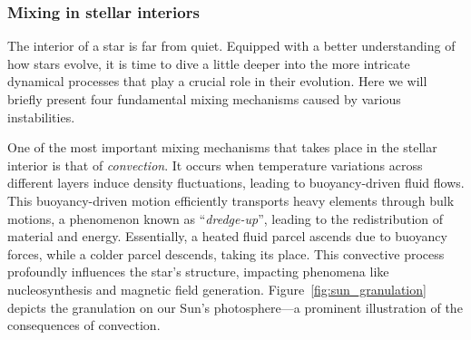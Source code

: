 \documentclass[main.tex]{subfiles}
\begin{document}
    \subsubsection{Mixing in stellar interiors}
    The interior of a star is far from quiet. Equipped with a better understanding of how stars evolve, it is time to dive a little deeper into the more intricate dynamical processes that play a crucial role in their evolution. Here we will briefly present four fundamental mixing mechanisms caused by various instabilities.

    One of the most important mixing mechanisms that takes place in the stellar interior is that of \textit{convection}. It occurs when temperature variations across different layers induce density fluctuations, leading to buoyancy-driven fluid flows. This buoyancy-driven motion efficiently transports heavy elements through bulk motions, a phenomenon known as ``\textit{dredge-up}'', leading to the redistribution of material and energy. Essentially, a heated fluid parcel ascends due to buoyancy forces, while a colder parcel descends, taking its place. This convective process profoundly influences the star's structure, impacting phenomena like nucleosynthesis and magnetic field generation. Figure~\ref{fig:sun_granulation} depicts the granulation on our Sun's photosphere---a prominent illustration of the consequences of convection.
    
\end{document}

